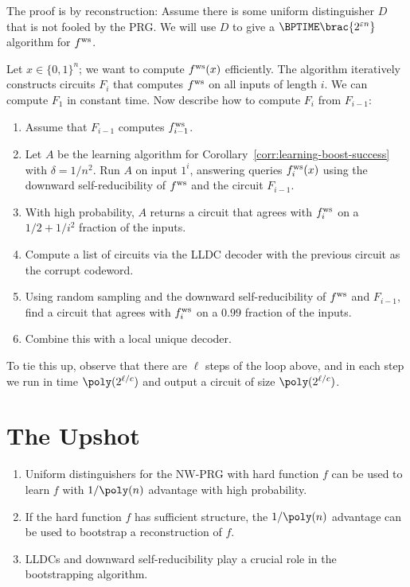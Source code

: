 \begin{proofsk}
  The proof is by reconstruction: Assume there is some uniform distinguisher
  $D$ that is not fooled by the PRG. We will use $D$ to give a
  $\BPTIME\brac{2^{\eps n}}$ algorithm for $ f^{\text{ws}} $.

  Let $x \in \{0, 1\}^n$; we want to compute $ f^{\text{ws}} (x)$ efficiently. The
  algorithm iteratively constructs circuits $F_i$ that computes $ f^{\text{ws}} $ on all
  inputs of length $i$. We can compute $F_1$ in constant time. Now describe how
  to compute $F_i$ from $F_{i-1}$:
  \begin{enumerate}
    \item Assume that $F_{i - 1}$ computes $ f^{\text{ws}} _{i - 1}$.
    \item Let $A$ be the learning algorithm for
      Corollary~\ref{corr:learning-boost-success} with $\delta = 1/n^2$. Run
      $A$ on input $1^i$, answering queries $ f^{\text{ws}} _i(x)$ using the downward
      self-reducibility of $ f^{\text{ws}} $ and the circuit $F_{i - 1}$.
    \item With high probability, $A$ returns a circuit that agrees with
      $ f^{\text{ws}} _i$ on a $1/2 + 1/i^2$ fraction of the inputs.
    \item Compute a list of circuits via the LLDC decoder with the previous
      circuit as the corrupt codeword.
    \item Using random sampling and the downward self-reducibility of $ f^{\text{ws}} $
      and $F_{i - 1}$, find a circuit that agrees with $ f^{\text{ws}} _i$ on a $0.99$
      fraction of the inputs.
    \item Combine this with a local unique decoder.
  \end{enumerate}
  To tie this up, observe that there are $\ell$ steps of the loop above, and in
  each step we run in time $\poly(2^{\ell / c})$ and output a circuit of size
  $\poly(2^{\ell / c})$.
\end{proofsk}

\section*{The Upshot}

\begin{enumerate}
  \item Uniform distinguishers for the NW-PRG with hard function $f$ can be
    used to learn $f$ with $1/\poly(n)$ advantage with high probability.
  \item If the hard function $f$ has sufficient structure, the $1/\poly(n)$
    advantage can be used to bootstrap a reconstruction of $f$.
  \item LLDCs and downward self-reducibility play a crucial role in the
    bootstrapping algorithm.
\end{enumerate}
